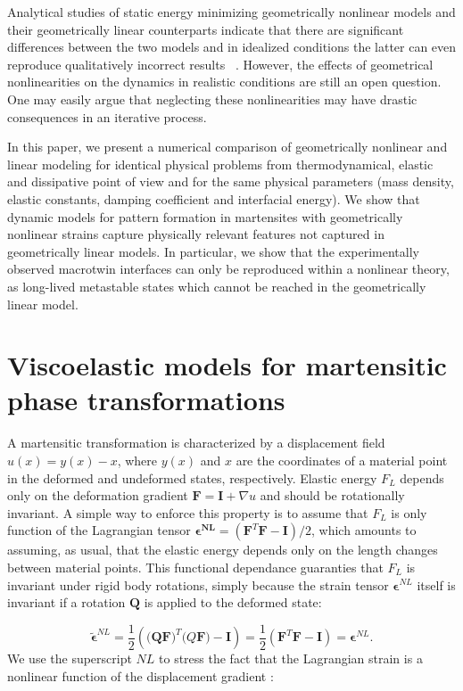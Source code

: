 \documentclass[twocolumn,amsmath,amssymb]{revtex4}
\begin{document}
Analytical studies of static energy minimizing geometrically nonlinear models and their geometrically linear counterparts indicate that there are significant differences between the two models and in idealized conditions the latter can even reproduce qualitatively incorrect results ~\cite{Bha03,DolMul95a,DolMul95c}. However, the effects of geometrical nonlinearities on the dynamics in realistic conditions are still an open question. One may easily argue that neglecting these nonlinearities may have drastic consequences in an iterative process.

 In this paper,  we present a numerical comparison of geometrically nonlinear and linear modeling for identical physical problems from thermodynamical, elastic and dissipative point of view and for the same physical parameters (mass density, elastic constants, damping coefficient and interfacial energy).  We show that dynamic models for pattern formation in martensites with geometrically nonlinear strains capture physically relevant features not captured in geometrically linear models. In particular, we show that the experimentally observed macrotwin interfaces can only be reproduced within a nonlinear theory, as long-lived metastable states which cannot be reached in the geometrically linear model.

\section{\label{sec:level1}Viscoelastic models for martensitic phase transformations}
%
%
A martensitic transformation is characterized by a displacement field $u(x)=y(x)-x$, where $y(x)$ and $x$ are the coordinates of a material point in the deformed and undeformed states, respectively. Elastic energy $F_L$ depends only on the deformation gradient $\bm{F}= \bm I + \nabla{u}$ and should be rotationally invariant. A simple way to enforce this property is to assume that $F_L$ is only function of the Lagrangian tensor $\bm{\epsilon^{NL}}= \left(\bm{F}^T\bm{F}-\bm{I}\right)/2$, which amounts to assuming, as usual, that the elastic energy depends only on the length changes between material points.  This functional dependance guaranties that $F_L$ is invariant under rigid body rotations, simply because the strain tensor $\bm \epsilon^{NL}$ itself is invariant if a rotation $\bm Q$ is applied to the deformed state:

\begin{equation}
\bm{\tilde \epsilon}^{NL}=\frac12 \left(\bm{(\bm QF})^T(Q\bm{F)}-\bm{I}\right)=  \frac12 \left(\bm{F}^T\bm{F}-\bm{I}\right)= \bm \epsilon ^{NL}.
\end{equation}
%
We use the superscript $NL$ to stress the fact that the Lagrangian strain is a nonlinear  function of the displacement gradient :
\end{document}
